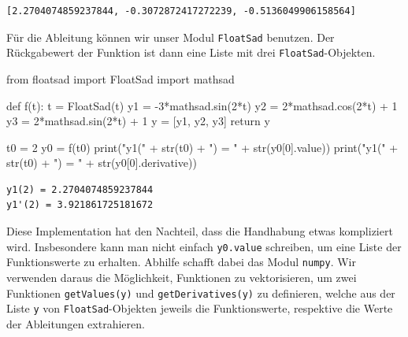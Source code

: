 \documentclass[
  a4paper,
  DIV=11]{scrreprt}
\newenvironment{Shaded}{\begin{snugshade}}{\end{snugshade}}
\newcommand{\BuiltInTok}[1]{\textcolor[rgb]{0.00,0.23,0.31}{#1}}
\newcommand{\ControlFlowTok}[1]{\textcolor[rgb]{0.00,0.23,0.31}{#1}}
\newcommand{\DecValTok}[1]{\textcolor[rgb]{0.68,0.00,0.00}{#1}}
\newcommand{\ImportTok}[1]{\textcolor[rgb]{0.00,0.46,0.62}{#1}}
\newcommand{\KeywordTok}[1]{\textcolor[rgb]{0.00,0.23,0.31}{#1}}
\newcommand{\NormalTok}[1]{\textcolor[rgb]{0.00,0.23,0.31}{#1}}
\newcommand{\OperatorTok}[1]{\textcolor[rgb]{0.37,0.37,0.37}{#1}}
\newcommand{\StringTok}[1]{\textcolor[rgb]{0.13,0.47,0.30}{#1}}
\theoremstyle{definition}
\theoremstyle{definition}
\theoremstyle{remark}
\begin{document}
\begin{verbatim}
[2.2704074859237844, -0.3072872417272239, -0.5136049906158564]
\end{verbatim}

Für die Ableitung können wir unser Modul \texttt{FloatSad} benutzen. Der
Rückgabewert der Funktion ist dann eine Liste mit drei
\texttt{FloatSad}-Objekten.

\begin{Shaded}
\begin{Highlighting}[]
\ImportTok{from}\NormalTok{ floatsad }\ImportTok{import}\NormalTok{ FloatSad }
\ImportTok{import}\NormalTok{ mathsad}

\KeywordTok{def}\NormalTok{ f(t):}
\NormalTok{    t }\OperatorTok{=}\NormalTok{ FloatSad(t)}
\NormalTok{    y1 }\OperatorTok{=} \OperatorTok{{-}}\DecValTok{3}\OperatorTok{*}\NormalTok{mathsad.sin(}\DecValTok{2}\OperatorTok{*}\NormalTok{t)}
\NormalTok{    y2 }\OperatorTok{=}  \DecValTok{2}\OperatorTok{*}\NormalTok{mathsad.cos(}\DecValTok{2}\OperatorTok{*}\NormalTok{t) }\OperatorTok{+} \DecValTok{1}
\NormalTok{    y3 }\OperatorTok{=}  \DecValTok{2}\OperatorTok{*}\NormalTok{mathsad.sin(}\DecValTok{2}\OperatorTok{*}\NormalTok{t) }\OperatorTok{+} \DecValTok{1}
\NormalTok{    y }\OperatorTok{=}\NormalTok{ [y1, y2, y3]}
    \ControlFlowTok{return}\NormalTok{ y}

\NormalTok{t0 }\OperatorTok{=} \DecValTok{2}
\NormalTok{y0 }\OperatorTok{=}\NormalTok{ f(t0)}
\BuiltInTok{print}\NormalTok{(}\StringTok{"y1("} \OperatorTok{+} \BuiltInTok{str}\NormalTok{(t0) }\OperatorTok{+} \StringTok{") = "} \OperatorTok{+} \BuiltInTok{str}\NormalTok{(y0[}\DecValTok{0}\NormalTok{].value))}
\BuiltInTok{print}\NormalTok{(}\StringTok{"y1\textquotesingle{}("} \OperatorTok{+} \BuiltInTok{str}\NormalTok{(t0) }\OperatorTok{+} \StringTok{") = "} \OperatorTok{+} \BuiltInTok{str}\NormalTok{(y0[}\DecValTok{0}\NormalTok{].derivative))}
\end{Highlighting}
\end{Shaded}

\begin{verbatim}
y1(2) = 2.2704074859237844
y1'(2) = 3.921861725181672
\end{verbatim}

Diese Implementation hat den Nachteil, dass die Handhabung etwas
kompliziert wird. Insbesondere kann man nicht einfach \texttt{y0.value}
schreiben, um eine Liste der Funktionswerte zu erhalten. Abhilfe schafft
dabei das Modul \texttt{numpy}. Wir verwenden daraus die Möglichkeit,
Funktionen zu vektorisieren, um zwei Funktionen \texttt{getValues(y)}
und \texttt{getDerivatives(y)} zu definieren, welche aus der Liste
\texttt{y} von \texttt{FloatSad}-Objekten jeweils die Funktionswerte,
respektive die Werte der Ableitungen extrahieren.
\end{document}
